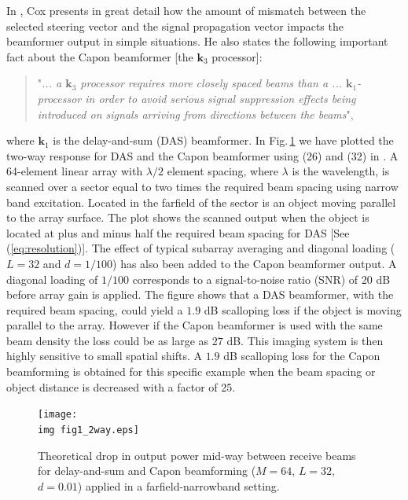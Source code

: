 \documentclass[journal]{IEEEtran}
\newcommand{\mat}[1]{\mathbf{#1}}
\renewcommand{\vec}[1]{\mathbf{#1}}
\newcommand{\img}{img/}
\begin{document}
In \cite{Cox1973}, Cox presents in great detail how the amount of mismatch between the selected steering vector and the signal propagation vector impacts the beamformer output in simple situations. He also states the following important fact about the Capon beamformer [the $\vec{k}_3$ processor]: 
\begin{quote}
"\textit{... a $\vec{k}_3$ processor requires more closely spaced beams than a ... $\vec{k}_1$-processor in order to avoid serious signal suppression effects being introduced on signals arriving from directions between the beams}", 
\end{quote}
where $\vec{k}_1$ is the delay-and-sum (DAS) beamformer. In Fig.\,\ref{fig:das_capon_beams} we have plotted the two-way response for DAS and the Capon beamformer using (26) and (32) in \cite{Cox1973}. A 64-element linear array with $\lambda/2$ element spacing, where $\lambda$ is the wavelength, is scanned over a sector equal to two times the required beam spacing using narrow band excitation. Located in the farfield of the sector is an object moving parallel to the array surface. The plot shows the scanned output when the object is located at plus and minus half the required beam spacing for DAS [See (\ref{eq:resolution})]. %
The effect of typical subarray averaging and diagonal loading ($L=32$ and $d=1/100$) has also been added to the Capon beamformer output. A diagonal loading of $1/100$ corresponds to a signal-to-noise ratio (SNR) of 20 dB before array gain is applied. The figure shows that a DAS beamformer, with the required beam spacing, could yield a $1.9$ dB scalloping loss \cite{Harris1978} if the object is moving parallel to the array. However if the Capon beamformer is used with the same beam density the loss could be as large as $27$ dB. This imaging system is then highly sensitive to small spatial shifts. A $1.9$ dB scalloping loss for the Capon beamforming is obtained for this specific example when the beam spacing or object distance is decreased with a factor of 25. 

\begin{figure}[!t]
\centerline{
\texttt{[image: \\img fig1\_2way.eps]}
}
\caption{Theoretical drop in output power mid-way between receive beams for delay-and-sum and Capon beamforming ($M=64$, $L=32$, $d=0.01$) applied in a farfield-narrowband setting. %
}
\label{fig:das_capon_beams}
\end{figure}
\end{document}
